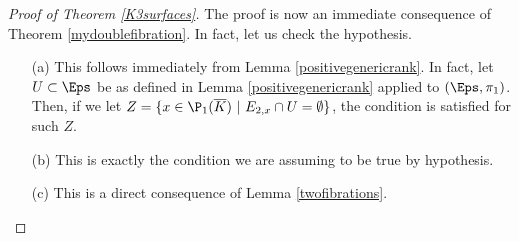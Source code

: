 \begin{proof}[Proof of Theorem \ref{K3surfaces}]
	The proof is now an immediate consequence of Theorem \ref{mydoublefibration}. In fact, let us check the hypothesis.
	\begin{enumerate}
		\item[(a)] This follows immediately from Lemma \ref{positivegenericrank}. In fact, let $U \subset \Eps$ be as defined in Lemma \ref{positivegenericrank} applied to $(\Eps, \pi_1)$. Then, if we let $Z= \{x \in \P_1(\overline{K}) \ | \ E_{2,x}\cap U = \emptyset\}$, the condition is satisfied for such $Z$.
		\item[(b)] This is exactly the condition we are assuming to be true by hypothesis.
		\item[(c)] This is a direct consequence of Lemma \ref{twofibrations}. 
	\end{enumerate}
\end{proof}
